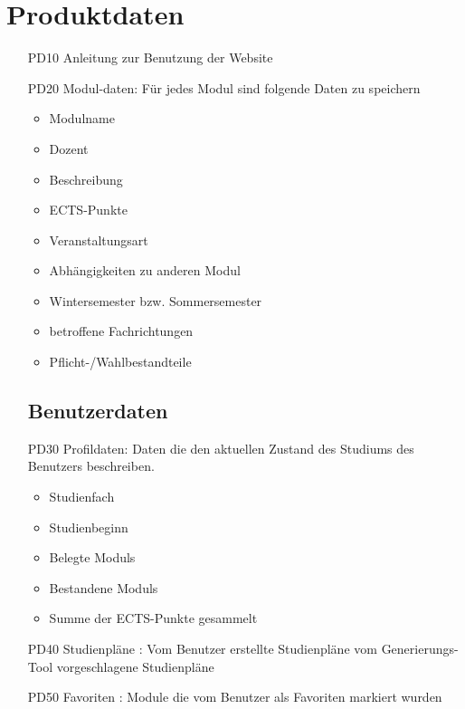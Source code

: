 \section{Produktdaten}
	\begin{itemize}[nosep]
	\subsection{Systemdaten}
	\item[PD10]Anleitung zur Benutzung der 		Website
	\item[PD20] \gls{Modul}-daten: Für jedes \gls{Modul} sind folgende Daten zu speichern	
	\begin{itemize}
	\item Modulname
	\item Dozent
	\item Beschreibung
	\item \gls{ECTS-Punkte}
	\item Veranstaltungsart
	\item Abhängigkeiten zu anderen \gls{Modul}
	\item Wintersemester bzw. Sommersemester
	\item betroffene Fachrichtungen 
	\item Pflicht-/Wahlbestandteile
	\end{itemize}	 
	\subsection{Benutzerdaten}
	\item[PD30]Profildaten: Daten die den aktuellen Zustand des Studiums des Benutzers beschreiben.
		\begin{itemize}
		\item Studienfach
		\item Studienbeginn
		\item Belegte \glspl{Modul}
		\item Bestandene \glspl{Modul} 
		\item Summe der \gls{ECTS-Punkte} gesammelt
		\end{itemize}
\item[PD40]Studienpläne : 
	Vom Benutzer erstellte Studienpläne 
	vom \gls{Generierungs-Tool} vorgeschlagene Studienpläne 
\item[PD50] Favoriten : Module die vom Benutzer als Favoriten markiert wurden
\end{itemize}